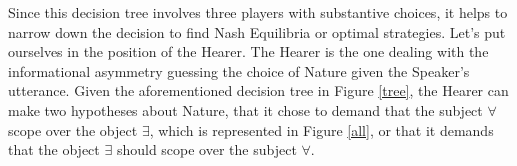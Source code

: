 \documentclass{article}
\begin{document}
%
%


Since this decision tree involves three players with substantive choices, it helps to narrow down the decision to find Nash Equilibria or optimal strategies.
Let's put ourselves in the position of the Hearer.
The Hearer is the one dealing with the informational asymmetry guessing the choice of Nature given the Speaker's utterance.
Given the aforementioned decision tree in Figure \ref{tree}, the Hearer can make two hypotheses about Nature, that it chose to demand that the subject $\forall$ scope over the object $\exists$, which is represented in Figure \ref{all}, or that it demands that the object $\exists$ should scope over the subject $\forall$.
\end{document}
